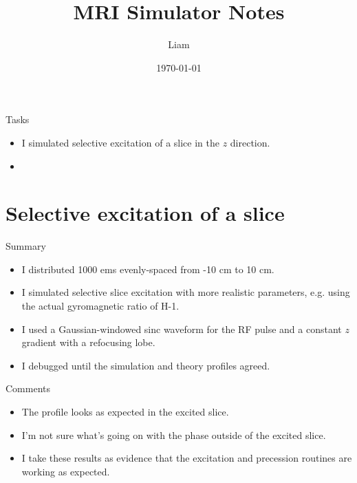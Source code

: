 \documentclass[dvipsnames]{beamer}
\title{MRI Simulator Notes}
\author{Liam}
\date{\today}
\begin{document}
\begin{frame}
\maketitle
\end{frame}

\begin{frame}{Tasks}
\begin{itemize}
\item I simulated selective excitation of a slice in the $z$ direction.
\item 
\end{itemize}
\end{frame}

\section{Selective excitation of a slice}

\begin{frame}{Summary}
\begin{itemize}
\item I distributed 1000 ems evenly-spaced from -10 cm to 10 cm.
\item I simulated selective slice excitation with more realistic parameters, e.g. using the actual gyromagnetic ratio of H-1.
\item I used a Gaussian-windowed sinc waveform for the RF pulse and a constant $z$ gradient with a refocusing lobe.
\item I debugged until the simulation and theory profiles agreed.
\end{itemize}
\end{frame}

\begin{frame}{Pulse sequence}
\begin{center}
\texttt{[image: \{excitation\_refocus\_pulse]}}
\end{center}
\end{frame}

\begin{frame}{Transverse magnetization profile}
\begin{center}
\texttt{[image: \{excitation\_refocus]}}
\end{center}
\end{frame}

\begin{frame}{Comments}
\begin{itemize}
\item The profile looks as expected in the excited slice.
\item I'm not sure what's going on with the phase outside of the excited slice.
\item I take these results as evidence that the excitation and precession routines are working as expected. 
\end{itemize}
\end{frame}
\end{document}
